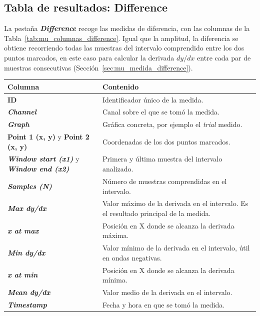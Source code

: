 \documentclass[11pt,a4paper]{article}
\begin{document}
    \subsection{Tabla de resultados: Difference}
    La pesta\~na \textbf{\textit{Difference}} recoge las medidas de diferencia, con las columnas de la Tabla~\ref{tab:mu_columnas_difference}. Igual que la amplitud, la diferencia se obtiene recorriendo todas las muestras del intervalo comprendido entre los dos puntos marcados, en este caso para calcular la derivada $dy/dx$ entre cada par de muestras consecutivas (Secci\'on~\ref{sec:mu_medida_difference}).

    \begin{center}
    \small
    \begin{tabularx}{\textwidth}{|p{}|X|}
    \hline
    \textbf{Columna} & \textbf{Contenido} \\
    \hline
    \textbf{ID} & Identificador \'unico de la medida. \\
    \hline
    \textbf{\textit{Channel}} & Canal sobre el que se tom\'o la medida. \\
    \hline
    \textbf{\textit{Graph}} & Gr\'afica concreta, por ejemplo el \textit{trial} medido. \\
    \hline
    \textbf{Point 1 (x, y)} y \textbf{Point 2 (x, y)} & Coordenadas de los dos puntos marcados. \\
    \hline
    \textbf{\textit{Window start (x1)}} y \textbf{\textit{Window end (x2)}} & Primera y \'ultima muestra del intervalo analizado. \\
    \hline
    \textbf{\textit{Samples (N)}} & N\'umero de muestras comprendidas en el intervalo. \\
    \hline
    \textbf{\textit{Max dy/dx}} & Valor m\'aximo de la derivada en el intervalo. Es el resultado principal de la medida. \\
    \hline
    \textbf{\textit{x at max}} & Posici\'on en X donde se alcanza la derivada m\'axima. \\
    \hline
    \textbf{\textit{Min dy/dx}} & Valor m\'inimo de la derivada en el intervalo, \'util en ondas negativas. \\
    \hline
    \textbf{\textit{x at min}} & Posici\'on en X donde se alcanza la derivada m\'inima. \\
    \hline
    \textbf{\textit{Mean dy/dx}} & Valor medio de la derivada en el intervalo. \\
    \hline
    \textbf{\textit{Timestamp}} & Fecha y hora en que se tom\'o la medida. \\
    \hline
    \end{tabularx}
    \label{tab:mu_columnas_difference}
    \end{center}
\end{document}
